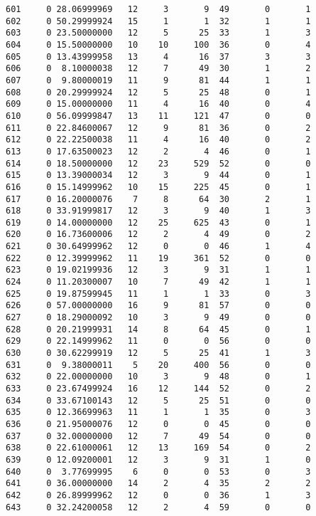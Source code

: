 \documentclass[
  letterpaper,
  DIV=11,
  numbers=noendperiod]{scrreprt}
\begin{document}
\begin{verbatim}
601     0 28.06999969   12     3       9  49       0       1
602     0 50.29999924   15     1       1  32       1       1
603     0 23.50000000   12     5      25  33       1       3
604     0 15.50000000   10    10     100  36       0       4
605     0 13.43999958   13     4      16  37       3       3
606     0  8.10000038   12     7      49  30       1       2
607     0  9.80000019   11     9      81  44       1       1
608     0 20.29999924   12     5      25  48       0       1
609     0 15.00000000   11     4      16  40       0       4
610     0 56.09999847   13    11     121  47       0       0
611     0 22.84600067   12     9      81  36       0       2
612     0 22.22500038   11     4      16  40       0       2
613     0 17.63500023   12     2       4  46       0       1
614     0 18.50000000   12    23     529  52       0       0
615     0 13.39000034   12     3       9  44       0       1
616     0 15.14999962   10    15     225  45       0       1
617     0 16.20000076    7     8      64  30       2       1
618     0 33.91999817   12     3       9  40       1       3
619     0 14.00000000   12    25     625  43       0       1
620     0 16.73600006   12     2       4  49       0       2
621     0 30.64999962   12     0       0  46       1       4
622     0 12.39999962   11    19     361  52       0       0
623     0 19.02199936   12     3       9  31       1       1
624     0 11.20300007   10     7      49  42       1       1
625     0 19.87599945   11     1       1  33       0       3
626     0 57.00000000   16     9      81  57       0       0
627     0 18.29000092   10     3       9  49       0       0
628     0 20.21999931   14     8      64  45       0       1
629     0 22.14999962   11     0       0  56       0       0
630     0 30.62299919   12     5      25  41       1       3
631     0  9.38000011    5    20     400  56       0       0
632     0 22.00000000   10     3       9  48       0       1
633     0 23.67499924   16    12     144  52       0       2
634     0 33.67100143   12     5      25  51       0       0
635     0 12.36699963   11     1       1  35       0       3
636     0 21.95000076   12     0       0  45       0       0
637     0 32.00000000   12     7      49  54       0       0
638     0 22.61000061   12    13     169  54       0       2
639     0 12.09200001   12     3       9  31       1       0
640     0  3.77699995    6     0       0  53       0       3
641     0 36.00000000   14     2       4  35       2       2
642     0 26.89999962   12     0       0  36       1       3
643     0 32.24200058   12     2       4  59       0       0

\end{verbatim}
\end{document}

